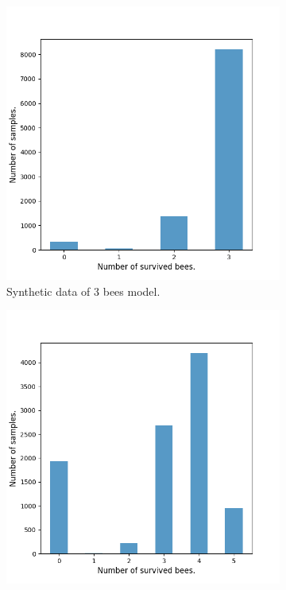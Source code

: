 \begin{figure}[H]
    \centering
    \begin{subfigure}{0.32\textwidth}
        \centering
        \includegraphics[width=\linewidth]{figures/bee_3_data.png}
        \caption{Synthetic data of 3 bees model.}
    \end{subfigure}
    \hfill
    \begin{subfigure}{0.32\textwidth}
        \centering
        \includegraphics[width=\linewidth]{figures/bee_5_data.png}

\end{subfigure}
\end{figure}
